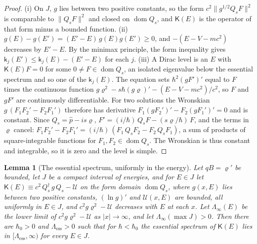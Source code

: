 \documentclass[aps,prd,onecolumn,tightenlines,nofootinbib,notitlepage,11pt,floatfix]{revtex4-2}
\theoremstyle{indentedtheorem}
\newtheorem{lemma}{Lemma}
\begin{document}
\begin{proof}
(i) On $J$, $g$ lies between two positive constants, so the form $c^2\|g^{1/2}Q_sF\|^2$ is comparable to $\|Q_sF\|^2$ and closed on $\operatorname{dom}Q_s$, and $\mathsf{K}(E)$ is the operator of that form minus a bounded function. (ii) $g(E)-g(E')=(E'-E)\,g(E)g(E')\geq0$, and $-(E-V-mc^2)$ decreases by $E'-E$. By the minimax principle, the form inequality gives $\mathsf{k}_j(E')\leq\mathsf{k}_j(E)-(E'-E)$ for each $j$. (iii) A Dirac level is an $E$ with $\mathsf{K}(E)F=0$ for some $0\neq F\in\operatorname{dom}Q_s$, an isolated eigenvalue below the essential spectrum and so one of the $\mathsf{k}_j(E)$. The equation sets $\hbar^2(gF')'$ equal to $F$ times the continuous function $g\varrho^2-s\hbar(g\varrho)'-(E-V-mc^2)/c^2$, so $F$ and $gF'$ are continuously differentiable. For two solutions the Wronskian $g\,(F_1F_2'-F_2F_1')$ therefore has derivative $F_1(gF_2')'-F_2(gF_1')'=0$ and is constant. Since $Q_s=\hat{p}-is\varrho$, $F'=(i/\hbar)\,Q_sF-(s\varrho/\hbar)\,F$, and the terms in $\varrho$ cancel: $F_1F_2'-F_2F_1'=(i/\hbar)\,(F_1\,Q_sF_2-F_2\,Q_sF_1)$, a sum of products of square-integrable functions for $F_1,F_2\in\operatorname{dom}Q_s$. The Wronskian is thus constant and integrable, so it is zero and the level is simple.
\end{proof}


\begin{lemma}[The essential spectrum, uniformly in the energy]\label{lem:ess}
Let $qB=\varrho'$ be bounded, let $J$ be a compact interval of energies, and for $E\in J$ let $\mathsf{K}(E)\equiv c^2\,Q_s^\dagger\,g\,Q_s-\mathcal{U}$ on the form domain $\operatorname{dom}Q_s$, where $g(x,E)$ lies between two positive constants, $(\ln g)'$ and $\mathcal{U}(x,E)$ are bounded, all uniformly in $E\in J$, and $c^2g\varrho^2-\mathcal{U}$ decreases with $E$ at each $x$. Let $\Lambda_\infty(E)$ be the lower limit of $c^2g\varrho^2-\mathcal{U}$ as $|x|\to\infty$, and let $\Lambda_\infty(\max J)>0$. Then there are $\hbar_0>0$ and $\Lambda_\text{ess}>0$ such that for $\hbar<\hbar_0$ the essential spectrum of $\mathsf{K}(E)$ lies in $[\Lambda_\text{ess},\infty)$ for every $E\in J$.
\end{lemma}
\end{document}
